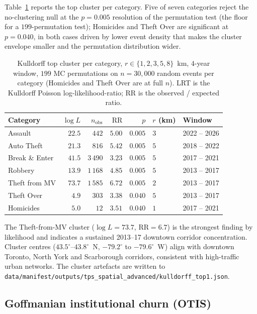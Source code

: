 \documentclass[article,shortnames,nojss]{jss}
\begin{document}
Table~\ref{tab:kulldorff-top} reports the top cluster per category.
Five of seven categories reject the no-clustering null at the
$p = 0.005$ resolution of the permutation test (the floor for a
$199$-permutation test); Homicides and Theft Over are
significant at $p = 0.040$, in both cases driven by lower event
density that makes the cluster envelope smaller and the
permutation distribution wider.

\begin{table}[h]
\centering\footnotesize
\caption{Kulldorff top cluster per category, $r\in\{1,2,3,5,8\}$~km,
$4$-year window, $199$ MC permutations on $n=30{,}000$ random events
per category (Homicides and Theft Over are at full $n$).  LRT is
the Kulldorff Poisson log-likelihood-ratio; RR is the observed /
expected ratio.}\label{tab:kulldorff-top}
\begin{tabular}{lrrrrll}
\toprule
Category & $\log\!L$ & $n_{\text{obs}}$ & $\text{RR}$ & $p$ &
$r$ (km) & Window\\\midrule
Assault          & $22.5$ & $\phantom{0}442$ & $5.00$ & $0.005$ & $3$ & 2022 -- 2026\\
Auto Theft       & $21.3$ & $\phantom{0}816$ & $5.42$ & $0.005$ & $5$ & 2018 -- 2022\\
Break \& Enter   & $41.5$ & $3\,490$ & $3.23$ & $0.005$ & $5$ & 2017 -- 2021\\
Robbery          & $13.9$ & $1\,168$ & $4.85$ & $0.005$ & $5$ & 2013 -- 2017\\
Theft from MV    & $73.7$ & $1\,585$ & $6.72$ & $0.005$ & $2$ & 2013 -- 2017\\
Theft Over       & $\phantom{0}4.9$ & $\phantom{0}303$ & $3.38$ & $0.040$ & $5$ & 2013 -- 2017\\
Homicides        & $\phantom{0}5.0$ & $\phantom{00}12$ & $3.51$ & $0.040$ & $1$ & 2017 -- 2021\\
\bottomrule
\end{tabular}
\end{table}

The Theft-from-MV cluster ($\log L = 73.7$, $\text{RR}=6.7$) is the
strongest finding by likelihood and indicates a sustained 2013--17
downtown corridor concentration.  Cluster centres
($43.5^\circ$--$43.8^\circ$~N, $-79.2^\circ$ to $-79.6^\circ$~W)
align with downtown Toronto, North York and Scarborough corridors,
consistent with high-traffic urban networks.  The cluster
artefacts are written to
\texttt{data/manifest/outputs/tps\_spatial\_advanced/kulldorff\_top1.json}.

\subsection{Goffmanian institutional churn (OTIS)}\label{phys-goffman}
\end{document}
